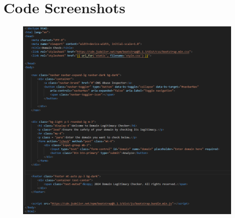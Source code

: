 \section{Code Screenshots}
\label{app:code}

\begin{figure}[h]
    \centering
    \includegraphics[width=0.8\linewidth]{appendix/a1.png}
    \label{fig:enter-label}
\end{figure}

